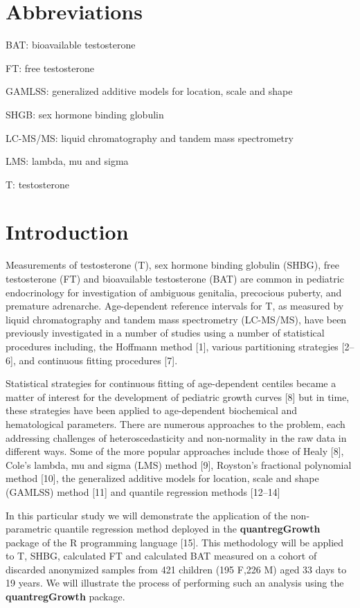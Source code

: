 \documentclass[]{elsarticle} %
\begin{document}
\hypertarget{abbreviations}{%
\section{Abbreviations}\label{abbreviations}}

BAT: bioavailable testosterone

FT: free testosterone

GAMLSS: generalized additive models for location, scale and shape

SHGB: sex hormone binding globulin

LC-MS/MS: liquid chromatography and tandem mass spectrometry

LMS: lambda, mu and sigma

T: testosterone

\hypertarget{introduction}{%
\section{Introduction}\label{introduction}}

Measurements of testosterone (T), sex hormone binding globulin (SHBG),
free testosterone (FT) and bioavailable testosterone (BAT) are common in
pediatric endocrinology for investigation of ambiguous genitalia,
precocious puberty, and premature adrenarche. Age-dependent reference
intervals for T, as measured by liquid chromatography and tandem mass
spectrometry (LC-MS/MS), have been previously investigated in a number
of studies using a number of statistical procedures including, the
Hoffmann method {[}1{]}, various partitioning strategies {[}2--6{]}, and
continuous fitting procedures {[}7{]}.

Statistical strategies for continuous fitting of age-dependent centiles
became a matter of interest for the development of pediatric growth
curves {[}8{]} but in time, these strategies have been applied to
age-dependent biochemical and hematological parameters. There are
numerous approaches to the problem, each addressing challenges of
heteroscedasticity and non-normality in the raw data in different ways.
Some of the more popular approaches include those of Healy {[}8{]},
Cole's lambda, mu and sigma (LMS) method {[}9{]}, Royston's fractional
polynomial method {[}10{]}, the generalized additive models for
location, scale and shape (GAMLSS) method {[}11{]} and quantile
regression methods {[}12--14{]}

In this particular study we will demonstrate the application of the
non-parametric quantile regression method deployed in the
\textbf{quantregGrowth} package of the R programming language {[}15{]}.
This methodology will be applied to T, SHBG, calculated FT and
calculated BAT measured on a cohort of discarded anonymized samples from
421 children (195 F,226 M) aged 33 days to 19 years. We will illustrate
the process of performing such an analysis using the
\textbf{quantregGrowth} package.
\end{document}
